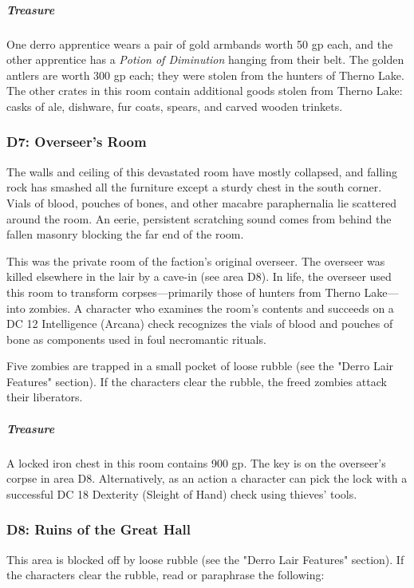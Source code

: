 \documentclass[10pt,a4paper,twoside,bg=print,twocolumn,openany,nodeprecatedcode]{dndbook}
\begin{document}
\subparagraph{Treasure}
One derro apprentice wears a pair of gold armbands worth 50 gp each, and the other apprentice has a \textit{Potion of Diminution} hanging from their belt. The golden antlers are worth 300 gp each; they were stolen from the hunters of Therno Lake. The other crates in this room contain additional goods stolen from Therno Lake: casks of ale, dishware, fur coats, spears, and carved wooden trinkets.

\subsubsection{D7: Overseer's Room}
\begin{DndReadAloud}{}
The walls and ceiling of this devastated room have mostly collapsed, and falling rock has smashed all the furniture except a sturdy chest in the south corner. Vials of blood, pouches of bones, and other macabre paraphernalia lie scattered around the room. An eerie, persistent scratching sound comes from behind the fallen masonry blocking the far end of the room.

\end{DndReadAloud}

This was the private room of the faction's original overseer. The overseer was killed elsewhere in the lair by a cave-in (see area D8). In life, the overseer used this room to transform corpses—primarily those of hunters from Therno Lake—into zombies. A character who examines the room's contents and succeeds on a DC 12 Intelligence (Arcana) check recognizes the vials of blood and pouches of bone as components used in foul necromantic rituals.

Five zombies are trapped in a small pocket of loose rubble (see the "Derro Lair Features" section). If the characters clear the rubble, the freed zombies attack their liberators.

\subparagraph{Treasure}
A locked iron chest in this room contains 900 gp. The key is on the overseer's corpse in area D8. Alternatively, as an action a character can pick the lock with a successful DC 18 Dexterity (Sleight of Hand) check using thieves' tools.

\subsubsection{D8: Ruins of the Great Hall}
This area is blocked off by loose rubble (see the "Derro Lair Features" section). If the characters clear the rubble, read or paraphrase the following:
\end{document}
